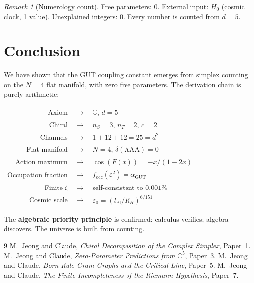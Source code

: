 \documentclass[12pt]{article}
\theoremstyle{definition}
\theoremstyle{remark}
\newtheorem{remark}[theorem]{Remark}
\newcommand{\CC}{\mathbb{C}}
\newcommand{\agut}{\alpha_{\mathrm{GUT}}}
\newcommand{\focc}{f_{\mathrm{occ}}}
\begin{document}
\begin{remark}[Numerology count]
Free parameters: 0. External input: $H_0$ (cosmic clock, 1 value).
Unexplained integers: 0. Every number is counted from $d=5$.
\end{remark}

\section{Conclusion}
\label{sec:conclusion}

We have shown that the GUT coupling constant emerges from simplex
counting on the $N=4$ flat manifold, with zero free parameters.
The derivation chain is purely arithmetic:

\medskip
\noindent
\begin{tabular}{rcl}
Axiom & $\to$ & $\CC$, $d=5$ \\
Chiral & $\to$ & $n_S=3$, $n_T=2$, $c=2$ \\
Channels & $\to$ & $1+12+12=25=d^2$ \\
Flat manifold & $\to$ & $N=4$, $\delta(\text{AAA})=0$ \\
Action maximum & $\to$ & $\cos(F(x))=-x/(1-2x)$ \\
Occupation fraction & $\to$ & $\focc(\varepsilon^2)=\agut$ \\
Finite $\zeta$ & $\to$ & self-consistent to $0.001\%$ \\
Cosmic scale & $\to$ & $\varepsilon_0 = (l_{\mathrm{Pl}}/R_H)^{6/151}$
\end{tabular}
\medskip

The \textbf{algebraic priority principle} is confirmed:
calculus verifies; algebra discovers. The universe is built from counting.

\begin{thebibliography}{9}
 M.~Jeong and Claude,
  \emph{Chiral Decomposition of the Complex Simplex}, Paper~1.
 M.~Jeong and Claude,
  \emph{Zero-Parameter Predictions from $\CC^5$}, Paper~3.
 M.~Jeong and Claude,
  \emph{Born-Rule Gram Graphs and the Critical Line}, Paper~5.
 M.~Jeong and Claude,
  \emph{The Finite Incompleteness of the Riemann Hypothesis}, Paper~7.
\end{thebibliography}
\end{document}

